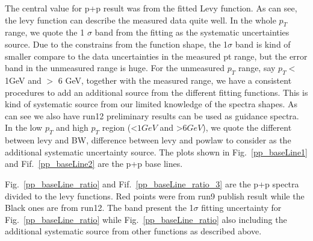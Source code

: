 
The central value for p+p result was from the fitted Levy function. As can see, the levy function can describe the measured data quite well. In the whole $p_T$ range, we quote the 1 $\sigma$ band from the fitting as the systematic uncertainties source. Due to the constrains from the function shape, the 1$\sigma$ band is kind of smaller compare to the data uncertainties in the measured pt range, but the error band in the unmeasured range is huge. For the unmeasured $p_T$ range, say $p_T <$ 1GeV and $>$ 6 GeV, together with the measured range, we have a consistent procedures to add an additional source from the different fitting functions. This is kind of systematic source from our limited knowledge of the spectra shapes. As can see we also have run12 preliminary results can be used as guidance spectra. In the low $p_T$ and high $p_T$ region (<$1 GeV$ and >$6 GeV$), we quote the different between levy and BW, difference between levy and powlaw to consider as the additional systematic uncertainty source. The plots shown in Fig.~\ref{pp_baseLine1} and Fif.~\ref{pp_baseLine2} are the p+p base lines. 

Fig.~\ref{pp_baseLine_ratio} and Fif.~\ref{pp_baseLine_ratio_3} are the p+p spectra divided to the levy functions. Red points were from run9 publish result while the Black ones are from run12. The band present the 1$\sigma$ fitting uncertainty for Fig.~\ref{pp_baseLine_ratio} while Fig.~\ref{pp_baseLine_ratio} also including the additional systematic source from other functions as described above.

